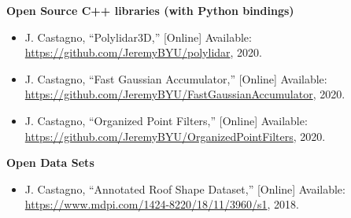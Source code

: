 \textbf{Open Source C++ libraries (with Python bindings)}

\begin{itemize}[noitemsep]
    \item J. Castagno, ``Polylidar3D,''   [Online]  Available: \url{https://github.com/JeremyBYU/polylidar}, 2020.
    \item J. Castagno, ``Fast Gaussian Accumulator,''   [Online]  Available: \url{https://github.com/JeremyBYU/FastGaussianAccumulator}, 2020.
    \item J. Castagno, ``Organized Point Filters,''   [Online]  Available: \url{https://github.com/JeremyBYU/OrganizedPointFilters}, 2020.
\end{itemize}

\textbf{Open Data Sets}

\begin{itemize}[noitemsep]
    \item J. Castagno, ``Annotated Roof Shape Dataset,''   [Online]  Available: \url{https://www.mdpi.com/1424-8220/18/11/3960/s1}, 2018.
\end{itemize}
